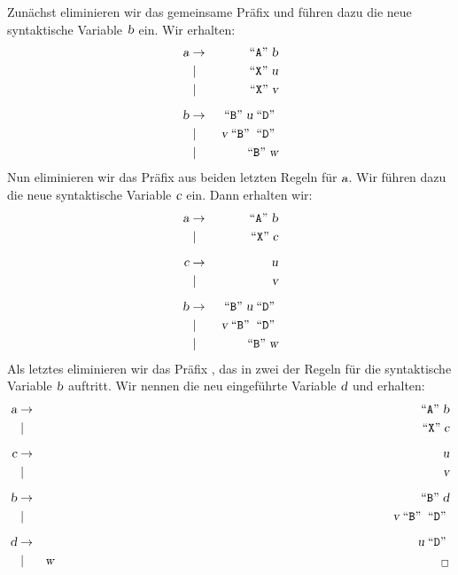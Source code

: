 \solution
Zun\"achst eliminieren wir das gemeinsame Pr\"afix  und f\"uhren dazu die neue
syntaktische Variable $\textsl{b}$ ein.  Wir erhalten:
\begin{eqnarray*}
  \textsl{a} & \rightarrow & \;\mbox{``\texttt{A}''}\; \textsl{b}             \\
    & \mid        & \;\mbox{``\texttt{X}''}\; \textsl{u}             \\
    & \mid        & \;\mbox{``\texttt{X}''}\; \textsl{v}             \\[0.2cm]
  \textsl{b} & \rightarrow & \;\mbox{``\texttt{B}''}\; \textsl{u} \;\mbox{``\texttt{D}''}\;  \\
    & \mid        & \;\textsl{v} \;\mbox{``\texttt{B}''}\; \;\mbox{``\texttt{D}''}\;\\
    & \mid        & \;\mbox{``\texttt{B}''}\; \textsl{w}             
\end{eqnarray*}
Nun eliminieren wir das Pr\"afix  aus beiden letzten Regeln f\"ur $\textsl{a}$.  Wir f\"uhren
dazu die neue syntaktische Variable $\textsl{c}$ ein. Dann erhalten wir:
\begin{eqnarray*}
  \textsl{a} & \rightarrow & \;\mbox{``\texttt{A}''}\; \textsl{b}              \\
    & \mid        & \;\mbox{``\texttt{X}''}\; \textsl{c}              \\[0.2cm]
  \textsl{c} & \rightarrow & \textsl{u}                         \\
    & \mid        & \textsl{v}                         \\[0.2cm]
  \textsl{b} & \rightarrow & \;\mbox{``\texttt{B}''}\; \textsl{u} \;\mbox{``\texttt{D}''}\;   \\
    & \mid        & \;\textsl{v} \;\mbox{``\texttt{B}''}\; \;\mbox{``\texttt{D}''}\; \\
    & \mid        & \;\mbox{``\texttt{B}''}\; \textsl{w}              
\end{eqnarray*}
Als letztes eliminieren wir das Pr\"afix , das in zwei der Regeln f\"ur die
syntaktische Variable $\textsl{b}$ auftritt.  Wir nennen die neu eingef\"uhrte Variable $\textsl{d}$ und erhalten:
\begin{eqnarray*}
  \textsl{a} & \rightarrow & \quoted{A} \textsl{b}              \\
    & \mid        & \quoted{X} \textsl{c}              \\[0.2cm]
  \textsl{c} & \rightarrow & \textsl{u}                         \\
    & \mid        & \textsl{v}                         \\[0.2cm]
  \textsl{b} & \rightarrow & \quoted{B} \textsl{d}              \\
    & \mid        & \;\textsl{v} \quoted{B} \quoted{D} \\[0.2cm]
  \textsl{d} & \rightarrow & \textsl{u} \quoted{D}              \\
    & \mid        & \textsl{w}              \hspace*{11cm} _\Box
\end{eqnarray*}
\vspace*{0.3cm}


